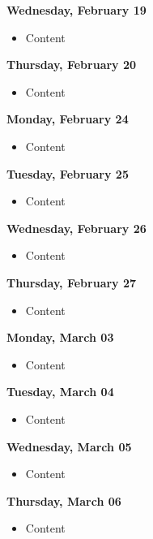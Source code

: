 \documentclass{article}
\begin{document}
\textbf{Wednesday, February 19}

\begin{itemize}
\item Content
\end{itemize}

\textbf{Thursday, February 20}

\begin{itemize}
\item Content
\end{itemize}

\textbf{Monday, February 24}

\begin{itemize}
\item Content
\end{itemize}

\textbf{Tuesday, February 25}

\begin{itemize}
\item Content
\end{itemize}

\textbf{Wednesday, February 26}

\begin{itemize}
\item Content
\end{itemize}

\textbf{Thursday, February 27}

\begin{itemize}
\item Content
\end{itemize}

\textbf{Monday, March 03}

\begin{itemize}
\item Content
\end{itemize}

\textbf{Tuesday, March 04}

\begin{itemize}
\item Content
\end{itemize}

\textbf{Wednesday, March 05}

\begin{itemize}
\item Content
\end{itemize}

\textbf{Thursday, March 06}

\begin{itemize}
\item Content
\end{itemize}
\end{document}
